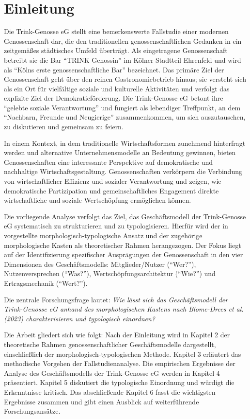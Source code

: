 \section{Einleitung}

Die Trink-Genosse eG stellt eine bemerkenswerte Fallstudie einer modernen Genossenschaft dar, die den traditionellen genossenschaftlichen Gedanken in ein zeitgemäßes städtisches Umfeld überträgt. Als eingetragene Genossenschaft betreibt sie die Bar \enquote{TRINK-Genossin} im Kölner Stadtteil Ehrenfeld und wird als \enquote{Kölns erste genossenschaftliche Bar} bezeichnet. Das primäre Ziel der Genossenschaft geht über den reinen Gastronomiebetrieb hinaus; sie versteht sich als ein Ort für vielfältige soziale und kulturelle Aktivitäten und verfolgt das explizite Ziel der Demokratieförderung. Die Trink-Genosse eG betont ihre \enquote{gelebte soziale Verantwortung} und fungiert als lebendiger Treffpunkt, an dem \enquote{Nachbarn, Freunde und Neugierige} zusammenkommen, um sich auszutauschen, zu diskutieren und gemeinsam zu feiern.

In einem Kontext, in dem traditionelle Wirtschaftsformen zunehmend hinterfragt werden und alternative Unternehmensmodelle an Bedeutung gewinnen, bieten Genossenschaften eine interessante Perspektive auf demokratische und nachhaltige Wirtschaftsgestaltung. Genossenschaften verkörpern die Verbindung von wirtschaftlicher Effizienz und sozialer Verantwortung und zeigen, wie demokratische Partizipation und gemeinschaftliches Engagement direkte wirtschaftliche und soziale Wertschöpfung ermöglichen können.

Die vorliegende Analyse verfolgt das Ziel, das Geschäftsmodell der Trink-Genosse eG systematisch zu strukturieren und zu typologisieren. Hierfür wird der in \textcite{blome-dreesGenossenschaftlicheGeschaeftsmodelleSemantik2023} vorgestellte morphologisch-typologische Ansatz und der zugehörige morphologische Kasten als theoretischer Rahmen herangezogen. Der Fokus liegt auf der Identifizierung spezifischer Ausprägungen der Genossenschaft in den vier Dimensionen des Geschäftsmodells: Mitglieder/Nutzer (\enquote{Wer?}), Nutzenversprechen (\enquote{Was?}), Wertschöpfungsarchitektur (\enquote{Wie?}) und Ertragsmechanik (\enquote{Wert?}).

Die zentrale Forschungsfrage lautet: \textit{Wie lässt sich das Geschäftsmodell der Trink-Genosse eG anhand des morphologischen Kastens nach Blome-Drees et al. (2023) charakterisieren und typologisch einordnen?}

Die Arbeit gliedert sich wie folgt: Nach der Einleitung wird in Kapitel 2 der theoretische Rahmen genossenschaftlicher Geschäftsmodelle dargestellt, einschließlich der morphologisch-typologischen Methode. Kapitel 3 erläutert das methodische Vorgehen der Fallstudienanalyse. Die empirischen Ergebnisse der Analyse des Geschäftsmodells der Trink-Genosse eG werden in Kapitel 4 präsentiert. Kapitel 5 diskutiert die typologische Einordnung und würdigt die Erkenntnisse kritisch. Das abschließende Kapitel 6 fasst die wichtigsten Ergebnisse zusammen und gibt einen Ausblick auf weiterführende Forschungsansätze.
